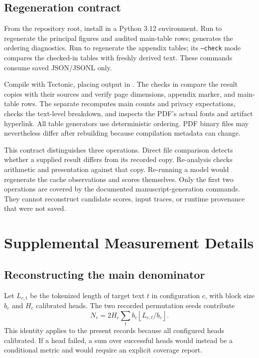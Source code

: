 \subsection{Regeneration contract}
From the repository root, install  in a Python 3.12 environment. Run  to regenerate the principal figures and audited main-table rows;  generates the ordering diagnostics. Run  to regenerate the appendix tables; its \texttt{--check} mode compares the checked-in tables with freshly derived text. These commands consume saved JSON/JSONL only.

Compile  with Tectonic, placing output in . The checks in  compare the result copies with their sources and verify page dimensions, appendix marker, and main-table rows. The separate  recomputes main counts and privacy expectations, checks the text-level breakdown, and inspects the PDF's actual fonts and artifact hyperlink. All table generators use deterministic ordering. PDF binary files may nevertheless differ after rebuilding because compilation metadata can change.

This contract distinguishes three operations. Direct file comparison detects whether a supplied result differs from its recorded copy. Re-analysis checks arithmetic and presentation against that copy. Re-running a model would regenerate the cache observations and scores themselves. Only the first two operations are covered by the documented manuscript-generation commands. They cannot reconstruct candidate scores, input traces, or runtime provenance that were not saved.

\section{Supplemental Measurement Details}
\label{app:metrics}
\subsection{Reconstructing the main denominator}
Let $L_{c,t}$ be the tokenized length of target text $t$ in configuration $c$, with block size $b_c$ and $H_c$ calibrated heads. The two recorded permutation seeds contribute
\begin{equation}
 N_c=2H_c\sum_t b_c\left\lfloor L_{c,t}/b_c\right\rfloor.
 \label{eq:denominator}
\end{equation}
This identity applies to the present records because all configured heads calibrated. If a head failed, a sum over successful heads would instead be a conditional metric and would require an explicit coverage report.

